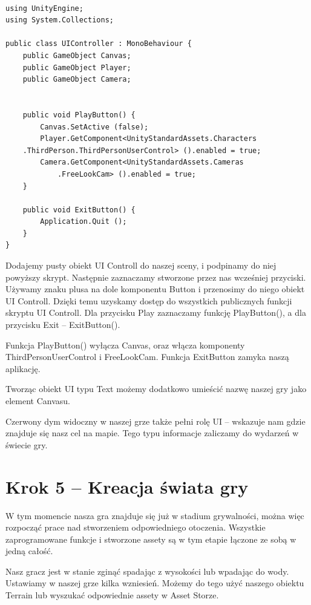 \documentclass[12pt]{xmgr}
\begin{document}
\begin{lstlisting}

using UnityEngine;
using System.Collections;

public class UIController : MonoBehaviour {
    public GameObject Canvas;
    public GameObject Player;
    public GameObject Camera;


    public void PlayButton() {
        Canvas.SetActive (false);
        Player.GetComponent<UnityStandardAssets.Characters
	.ThirdPerson.ThirdPersonUserControl> ().enabled = true;
        Camera.GetComponent<UnityStandardAssets.Cameras
			.FreeLookCam> ().enabled = true;
    }

    public void ExitButton() {
        Application.Quit ();
    }
}

\end{lstlisting}

Dodajemy pusty obiekt UI Controll do naszej sceny, i podpinamy do niej powyższy skrypt. Następnie zaznaczamy stworzone przez nas wcześniej przyciski. Używamy znaku plusa na dole komponentu Button i przenosimy do niego obiekt UI Controll. Dzięki temu uzyskamy dostęp do wszystkich publicznych funkcji skryptu UI Controll. Dla przycisku Play zaznaczamy funkcję PlayButton(), a dla przycisku Exit – ExitButton().

Funkcja PlayButton() wyłącza Canvas, oraz włącza komponenty ThirdPersonUserControl i FreeLookCam. Funkcja ExitButton zamyka naszą aplikację.

Tworząc obiekt UI typu Text możemy dodatkowo umieścić nazwę naszej gry jako element Canvasu.

Czerwony dym widoczny w naszej grze także pełni rolę UI – wskazuje nam gdzie znajduje się nasz cel na mapie. Tego typu informacje zaliczamy do wydarzeń w świecie gry.

\section{Krok 5 – Kreacja świata gry}

W tym momencie nasza gra znajduje się już w stadium grywalności, można więc rozpocząć prace nad stworzeniem odpowiedniego otoczenia. Wszystkie zaprogramowane funkcje i stworzone assety są w tym etapie łączone ze sobą w jedną całość.

Nasz gracz jest  w stanie zginąć spadając z wysokości lub wpadając do wody. Ustawiamy w naszej grze kilka wzniesień. Możemy do tego użyć naszego obiektu Terrain lub wyszukać odpowiednie assety w Asset Storze.
\end{document}
